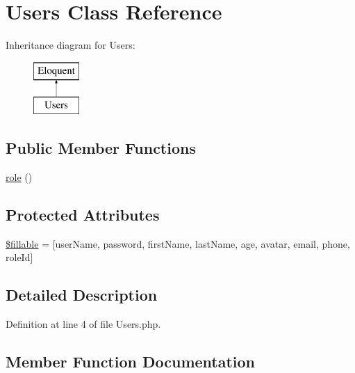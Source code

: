 \hypertarget{class_users}{}\section{Users Class Reference}
\label{class_users}
Inheritance diagram for Users\+:\begin{figure}[H]
\begin{center}
\leavevmode
\includegraphics[height=2.000000cm]{class_users}
\end{center}
\end{figure}
\subsection*{Public Member Functions}
\begin{DoxyCompactItemize}
\item 
\hyperlink{class_users_a4a492898ef6d04f34f38e12fab5dcf57}{role} ()
\end{DoxyCompactItemize}
\subsection*{Protected Attributes}
\begin{DoxyCompactItemize}
\item 
\hyperlink{class_users_a6a90e74ccdf5efd70d51d10c906f8e32}{\$fillable} = \mbox{[}\textquotesingle{}user\+Name\textquotesingle{}, \textquotesingle{}password\textquotesingle{}, \textquotesingle{}first\+Name\textquotesingle{}, \textquotesingle{}last\+Name\textquotesingle{}, \textquotesingle{}age\textquotesingle{}, \textquotesingle{}avatar\textquotesingle{}, \textquotesingle{}email\textquotesingle{}, \textquotesingle{}phone\textquotesingle{}, \textquotesingle{}role\+Id\textquotesingle{}\mbox{]}
\end{DoxyCompactItemize}


\subsection{Detailed Description}


Definition at line 4 of file Users.\+php.



\subsection{Member Function Documentation}
\hypertarget{class_users_a4a492898ef6d04f34f38e12fab5dcf57}{}
